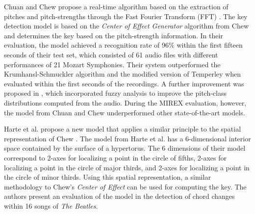 Chuan and Chew propose a real-time algorithm based on the extraction of pitches and pitch-strengths through the Fast Fourier Transform (FFT) \cite{chuan2005polyphonic}. The key detection model is based on the \emph{Center of Effect Generator} algorithm from Chew \cite{chew2002spiral} and determines the key based on the pitch-strength information. In their evaluation, the model achieved a recognition rate of 96\% within the first fifteen seconds of their test set, which consisted of 61 audio files with different performances of 21 Mozart Symphonies. Their system outperformed the Krumhansl-Schmuckler algorithm and the modified version of Temperley when evaluated within the first seconds of the recordings. A further improvement was proposed in \cite{chuan2005fuzzy}, which incorporated fuzzy analysis to improve the pitch-class distributions computed from the audio. During the MIREX evaluation, however, the model from Chuan and Chew underperformed other state-of-the-art models.



Harte et al. \cite{harte2006detecting} propose a new model that applies a similar principle to the spatial representation of Chew \cite{chew2000towards}. The model from Harte et al. has a 6-dimensional interior space contained by the surface of a hypertorus. The 6 dimensions of their model correspond to 2-axes for localizing a point in the circle of fifths, 2-axes for localizing a point in the circle of major thirds, and 2-axes for localizing a point in the circle of minor thirds. Using this spatial representation, a similar methodology to Chew's \emph{Center of Effect} can be used for computing the key. The authors present an evaluation of the model in the detection of chord changes within 16 songs of \emph{The Beatles}.

